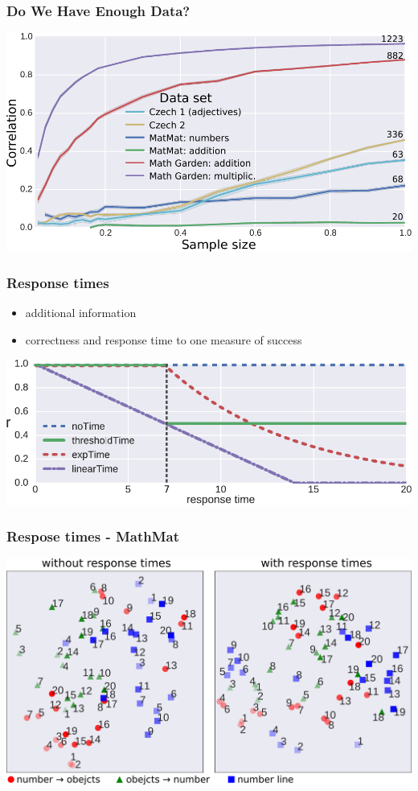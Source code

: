 \documentclass[xcolor=svgnames]{beamer}
\begin{document}
\begin{frame}
    \frametitle{Do We Have Enough Data?}
    \includegraphics[width=\linewidth]{figures/stability}
\end{frame}
\begin{frame}
    \frametitle{Response times}
    \begin{itemize}
        \item additional information
        \item correctness and response time to one measure of success
    \end{itemize}

    \vfill

    \centering
    \includegraphics[width=0.8\linewidth]{figures/time-uses}

\end{frame}
\begin{frame}
    \frametitle{Respose times - MathMat}
    \centering
    \includegraphics[width=\linewidth]{figures/matmat-projection-time}
\end{frame}
\end{document}
